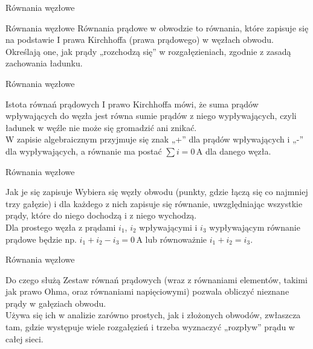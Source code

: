 
\begin{frame}{Równania węzłowe}
	\begin{block}{Równania węzłowe}
		Równania prądowe w obwodzie to równania, które zapisuje się na podstawie I prawa Kirchhoffa (prawa prądowego) w węzłach obwodu.
		Określają one, jak prądy „rozchodzą się” w rozgałęzieniach, zgodnie z zasadą zachowania ładunku.
	\end{block}
\end{frame}

\begin{frame}{Równania węzłowe}
	\begin{block}{Istota równań prądowych}
		I prawo Kirchhoffa mówi, że suma prądów wpływających do węzła jest równa sumie prądów z niego wypływających, czyli ładunek w węźle nie może się gromadzić ani znikać.\\
		W zapisie algebraicznym przyjmuje się znak „+” dla prądów wpływających i „-” dla wypływających, a równanie ma postać \(\sum i = 0\,\text{A}\) dla danego węzła.
	\end{block}
\end{frame}

\begin{frame}{Równania węzłowe}
	\begin{block}{Jak je się zapisuje}
		Wybiera się węzły obwodu (punkty, gdzie łączą się co najmniej trzy gałęzie) i dla każdego z nich zapisuje się równanie, uwzględniając wszystkie prądy, które do niego dochodzą i z niego wychodzą.\\
		Dla prostego węzła z prądami \(i_1\), \(i_2\) wpływającymi i \(i_3\) wypływającym równanie prądowe będzie np. \(i_1 + i_2 - i_3 = 0\,\text{A}\) lub równoważnie \(i_1 + i_2 = i_3\).
	\end{block}
\end{frame}

\begin{frame}{Równania węzłowe}
	\begin{block}{Do czego służą}
		Zestaw równań prądowych (wraz z równaniami elementów, takimi jak prawo Ohma, oraz równaniami napięciowymi) pozwala obliczyć nieznane prądy w gałęziach obwodu.\\
		Używa się ich w analizie zarówno prostych, jak i złożonych obwodów, zwłaszcza tam, gdzie występuje wiele rozgałęzień i trzeba wyznaczyć „rozpływ” prądu w całej sieci.
	\end{block}
\end{frame}

